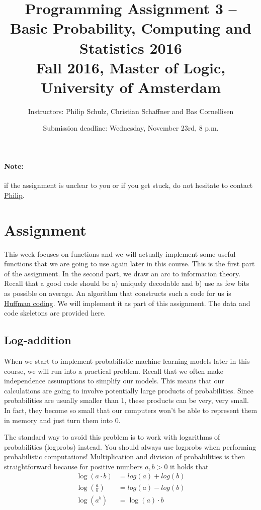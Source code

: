 \documentclass[11pt, leqno, a4paper]{article}
\title{Programming Assignment 3 -- Basic Probability, Computing and Statistics 2016 \\[2mm]
\large{Fall 2016, Master of Logic, University of Amsterdam}}
\author{Instructors: Philip Schulz, Christian Schaffner and Bas Cornellisen}
\date{Submission deadline: Wednesday, November 23rd, 8 p.m.}
\begin{document}
\maketitle

\paragraph{Note:} if the assignment is unclear to you or if you get stuck, do not hesitate to contact \href{mailto:P.Schulz@uva.nl}{Philip}.

\section{Assignment}

This week focuses on functions and we will actually implement some useful functions that we are going to use again later in this course. This is 
the first part of the assignment. In the second part, we draw an arc to information theory. Recall that a good code should be a) uniquely decodable
and b) use as few bits as possible on average. An algorithm that constructs such a code for us is \href{https://en.wikipedia.org/wiki/Huffman_coding}{Huffman coding}.
We will implement it as part of this assignment. The data and code skeletons are provided here.

\subsection{Log-addition}

When we start to implement probabilistic machine learning models later in this course, we will run into a practical problem. Recall that we often make 
independence assumptions to simplify our models. This means that our calculations are going to involve potentially large products of probabilities. Since
probabilities are usually smaller than 1, these products can be very, very small. In fact, they become so small that our computers won't be able to 
represent them in memory and just turn them into 0.

The standard way to avoid this problem is to work with logarithms of probabilities (logprobs) instead. You should always use logprobs when performing
probabilistic computations! Multiplication and division of probabilities is then straightforward because for positive numbers $ a,b > 0 $ it holds that
\begin{align*}
\log(a \cdot b) &= log(a) + log(b) \\
\log\left( \frac{a}{b} \right) &= log(a) - log(b) \\
\log\left( a^{b} \right) &= \log(a) \cdot b
\end{align*}
\end{document}
